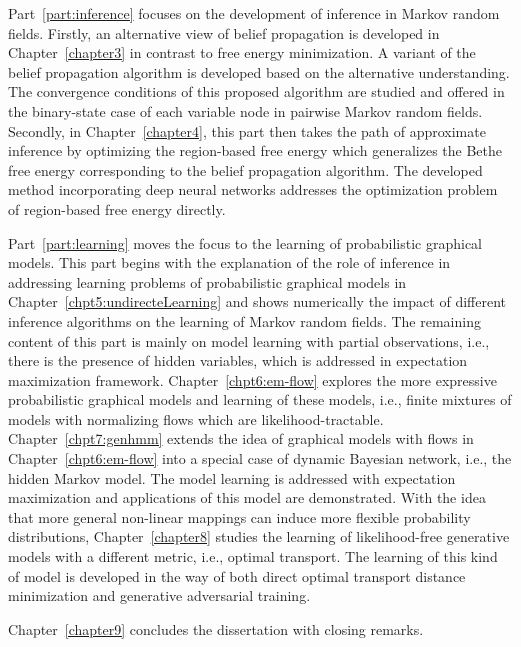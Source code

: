 Part~\ref{part:inference} focuses on the development of inference in Markov random fields. Firstly, an alternative view of belief propagation is developed in Chapter~\ref{chapter3} in contrast to free energy minimization. A variant of the belief propagation algorithm is developed based on the alternative understanding. The convergence conditions of this proposed algorithm are studied and offered in the binary-state case of each variable node in pairwise Markov random fields. Secondly, in Chapter~\ref{chapter4}, this part then takes the path of approximate inference by optimizing the region-based free energy which generalizes the Bethe free energy corresponding to the belief propagation algorithm. The developed method incorporating deep neural networks addresses the optimization problem of region-based free energy directly.

Part~\ref{part:learning} moves the focus to the learning of probabilistic graphical models. This part begins with the explanation of the role of inference in addressing learning problems of probabilistic graphical models in Chapter~\ref{chpt5:undirecteLearning} and shows numerically the impact of different inference algorithms on the learning of Markov random fields. The remaining content of this part is mainly on model learning with partial observations, i.e., there is the presence of hidden variables, which is addressed in expectation maximization framework. Chapter~\ref{chpt6:em-flow} explores the more expressive probabilistic graphical models and learning of these models, i.e., finite mixtures of models with normalizing flows which are likelihood-tractable. Chapter~\ref{chpt7:genhmm} extends the idea of graphical models with flows in Chapter~\ref{chpt6:em-flow} into a special case of dynamic Bayesian network, i.e., the hidden Markov model. The model learning is addressed with expectation maximization and applications of this model are demonstrated. With the idea that more general non-linear mappings can induce more flexible probability distributions, Chapter~\ref{chapter8} studies the learning of likelihood-free generative models with a different metric, i.e., optimal transport. The learning of this kind of model is developed in the way of both direct optimal transport distance minimization and generative adversarial training.

Chapter~\ref{chapter9} concludes the dissertation with closing remarks.
